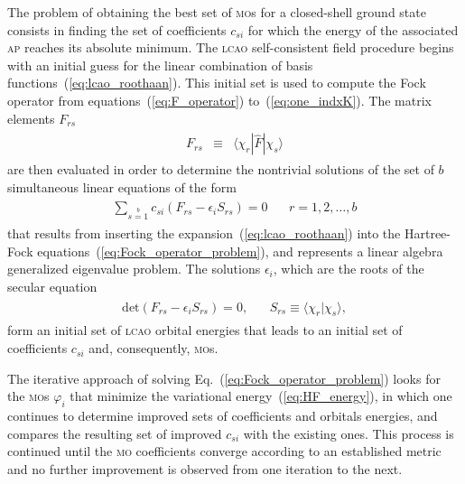 The problem of obtaining the best set of \textsc{mo}s for a
closed-shell ground state consists in finding the set of coefficients
$c_{si}$ for which the energy of the associated \textsc{ap} reaches
its absolute minimum. The \textsc{lcao} self-consistent field
procedure begins with an initial guess for the linear combination of
basis functions~(\ref{eq:lcao_roothaan}). This initial set is used to
compute the Fock operator from equations~(\ref{eq:F_operator})
to~(\ref{eq:one_indxK}). The matrix elements $F_{rs}$
%
\begin{eqnarray}
  \begin{split}
    F_{rs} & \equiv & \langle \chi_{r} | \hat{F} | \chi_{s} \rangle
  \end{split}
  \label{eq:F_matrix}
\end{eqnarray}
%
are then evaluated in order to determine the nontrivial solutions of
the set of $b$ simultaneous linear equations of the form
%
\begin{eqnarray}
  \begin{split}
    \sum\limits_{s=1}\limits^{b} c_{si} (F_{rs} - \epsilon_{i}S_{rs}) = 0 &
    ~~~~ r = 1,2,\dots,b
  \end{split}
  \label{eq:set_linear_eqs}
\end{eqnarray}
%
that results from inserting the expansion~(\ref{eq:lcao_roothaan})
into the Hartree-Fock equations~(\ref{eq:Fock_operator_problem}), and
represents a linear algebra generalized eigenvalue problem. The
solutions $\epsilon_{i}$, which are the roots of the secular
equation~\cite{Roothaan_HF,Levine_QChem}
%
\begin{eqnarray}
  \begin{split}
    \mathrm{det} (F_{rs} - \epsilon_{i}S_{rs}) = 0, &
    ~~~~ S_{rs} \equiv \langle \chi_{r} | \chi_{s} \rangle,
  \end{split}
  \label{eq:secular_eigenvalues}
\end{eqnarray}
%
form an initial set of \textsc{lcao} orbital energies that leads to an
initial set of coefficients $c_{si}$ and, consequently, \textsc{mo}s.

The iterative approach of solving Eq.~(\ref{eq:Fock_operator_problem})
looks for the \textsc{mo}s $\varphi_{i}$ that minimize the variational
energy~(\ref{eq:HF_energy}), in which one continues to determine
improved sets of coefficients and orbitals energies, and compares the
resulting set of improved $c_{si}$ with the existing ones. This
process is continued until the \textsc{mo} coefficients converge
according to an established metric and no further improvement is
observed from one iteration to the next.

